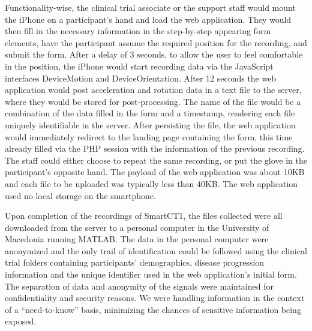 Functionality-wise, the clinical trial associate or the support staff would mount the iPhone on a participant's hand and load the web application. They would then fill in the necessary information in the step-by-step appearing form elements, have the participant assume the required position for the recording, and submit the form. After a delay of 3 seconds, to allow the user to feel comfortable in the position, the iPhone would start recording data via the JavaScript interfaces DeviceMotion and DeviceOrientation. After 12 seconds the web application would post acceleration and rotation data in a text file to the server, where they would be stored for post-processing. The name of the file would be a combination of the data filled in the form and a timestamp, rendering each file uniquely identifiable in the server. After persisting the file, the web application would immediately redirect to the landing page containing the form, this time already filled via the PHP session with the information of the previous recording. The staff could either choose to repeat the same recording, or put the glove in the participant's opposite hand. The payload of the web application was about 10KB and each file to be uploaded was typically less than 40KB. The web application used no local storage on the smartphone. 

Upon completion of the recordings of \gls{SmartCT1}, the files collected were all downloaded from the server to a personal computer in the University of Macedonia running MATLAB. The data in the personal computer were anonymized and the only trail of identification could be followed using the clinical trial folders containing participants' demographics, disease progression information and the unique identifier used in the web application's initial form. The separation of data and anonymity of the signals were maintained for confidentiality and security reasons. We were handling information in the context of a ``need-to-know'' basis, minimizing the chances of sensitive information being exposed. 



